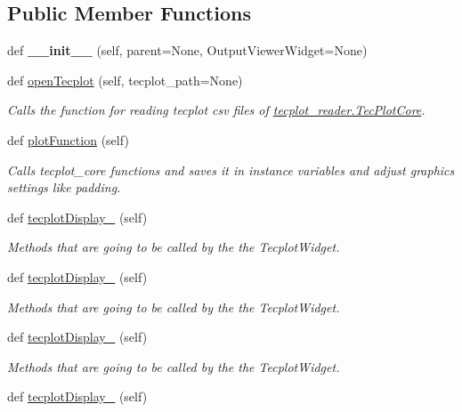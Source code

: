 \subsection*{Public Member Functions}
\begin{DoxyCompactItemize}
\item 
\hypertarget{a00117_abc270dcf6e8aaa3a645ae0258c4a9e5e}{}\label{a00117_abc270dcf6e8aaa3a645ae0258c4a9e5e} 
def {\bfseries \+\_\+\+\_\+init\+\_\+\+\_\+} (self, parent=None, Output\+Viewer\+Widget=None)
\item 
def \hyperlink{a00117_a6b4350a2c6ee537dba6bbe1549778636}{open\+Tecplot} (self, tecplot\+\_\+path=None)
\begin{DoxyCompactList}\small\item\em Calls the function for reading tecplot csv files of \hyperlink{a00125}{tecplot\+\_\+reader.\+Tec\+Plot\+Core}. \end{DoxyCompactList}\item 
def \hyperlink{a00117_a62c9724fbeda8d8780e57559bada3282}{plot\+Function} (self)
\begin{DoxyCompactList}\small\item\em Calls tecplot\+\_\+core functions and saves it in instance variables and adjust graphics settings like padding. \end{DoxyCompactList}\item 
def \hyperlink{a00117_ae792d997329b65cfed0b8a0a5feaa1a2}{tecplot\+Display\+\_} (self)
\begin{DoxyCompactList}\small\item\em Methods that are going to be called by the the Tecplot\+Widget. \end{DoxyCompactList}\item 
def \hyperlink{a00117_aec1f3f862b488e5f66161ca7241908c1}{tecplot\+Display\+\_} (self)
\begin{DoxyCompactList}\small\item\em Methods that are going to be called by the the Tecplot\+Widget. \end{DoxyCompactList}\item 
def \hyperlink{a00117_ae29c235476c3ca1ff19f4b933b86ed86}{tecplot\+Display\+\_} (self)
\begin{DoxyCompactList}\small\item\em Methods that are going to be called by the the Tecplot\+Widget. \end{DoxyCompactList}\item 
def \hyperlink{a00117_acdc9dc387494507084a2ab2cc0c8d9ac}{tecplot\+Display\+\_} (self)

\end{DoxyCompactItemize}
